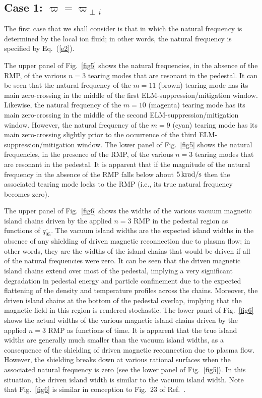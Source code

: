 \documentclass[12pt,prb,aps]{revtex4-1}
\begin{document}
\subsection{Case 1: $\varpi=\varpi_{\perp\,i}$}
The first case that we shall consider is that in which the natural frequency is determined by the local ion fluid; 
in other words, the natural frequency is specified by Eq.~(\ref{e2}). 

The upper panel of Fig.~\ref{fig5} shows the natural frequencies, in the absence of the RMP, of the various  $n=3$ tearing modes 
 that are resonant in the pedestal. It can be seen that the natural frequency of the $m=11$ (brown) tearing mode has its main zero-crossing in the middle
of the first ELM-suppression/mitigation window. Likewise, the natural frequency of the $m=10$ (magenta) tearing mode has its main zero-crossing in the middle of the
second ELM-suppression/mitigation window. However, the natural frequency of the $m=9$ (cyan) tearing mode  has its main zero-crossing slightly
prior to the occurrence of the third ELM-suppression/mitigation window. The lower panel of Fig.~\ref{fig5} shows the natural frequencies, in the presence of the RMP, of the various $n=3$
tearing modes that are resonant in the pedestal. It is apparent that if the magnitude of the natural frequency in the absence of the RMP falls below about
$5\,{\rm krad/s}$ then the associated tearing mode locks to the RMP (i.e., its true natural frequency becomes zero). 

The upper panel of Fig.~\ref{fig6} shows the widths of the various vacuum magnetic island chains driven by the applied $n=3$ RMP in the pedestal region as functions of $
\overline{q_{95}}$.
The vacuum island widths are the  expected island widths in the absence of any shielding of driven magnetic reconnection due to
plasma flow; in other words, they are the  widths of the island chains that would be driven if all of the natural frequencies were zero. It can be seen that
the driven magnetic island chains extend over most of the pedestal, implying a very significant degradation in pedestal energy and particle confinement due to the
expected flattening of the density and temperature profiles across the chains. Moreover, the driven island chains at the
bottom of the pedestal overlap, implying that the magnetic field in this region is rendered stochastic. The lower panel
of Fig.~\ref{fig6} shows the actual widths of the various magnetic island chains driven by the applied $n=3$ RMP as functions of time. It is apparent 
that the true island widths are generally much smaller than the vacuum island widths, as a consequence of the shielding of driven magnetic
reconnection due to plasma flow. However, the shielding breaks down at various rational surfaces when the associated natural frequency is zero (see the lower panel of
Fig.~\ref{fig5}). In this situation, the driven island width is similar to the vacuum island width. Note that Fig.~\ref{fig6} is similar in conception to
Fig.~23 of Ref.~. 
\end{document}
